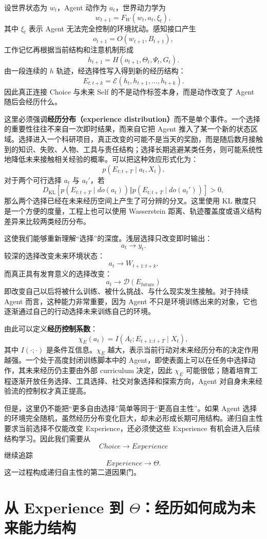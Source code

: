 设世界状态为 $w_t$，Agent 动作为 $a_t$，世界动力学为
\[
w_{t+1}=F_W(w_t,a_t,\xi_t),
\]
其中 $\xi_t$ 表示 Agent 无法完全控制的环境扰动。感知接口产生
\[
o_{t+1}=O(w_{t+1},B_{t+1}),
\]
工作记忆再根据当前结构和注意机制形成
\[
h_{t+1}=H(o_{t+1},\Theta_t,\Psi_t,G_t).
\]
由一段连续的 $h$ 轨迹，经选择性写入得到新的经历结构：
\[
E_{t:t+k}
=
\mathcal E
\left(
h_t,h_{t+1},\ldots,h_{t+k}
\right).
\]
因此真正连接 Choice 与未来 Self 的不是动作标签本身，而是动作改变了 Agent 随后会经历什么。

这里必须强调\textbf{经历分布（experience distribution）}而不是单个事件。一个选择的重要性往往不来自一次即时结果，而来自它把 Agent 推入了某一个新的状态区域。选择进入一个科研项目，真正改变的可能不是当天的奖励，而是随后数月接触到的知识、失败、人物、工具与责任结构；选择长期逃避某类任务，则可能系统性地降低未来接触相关经验的概率。可以把这种效应形式化为：
\[
p(E_{t:t+T}\mid a_t,X_t).
\]
对于两个可行选择 $a_t$ 与 $a_t'$，若
\[
D_{\mathrm{KL}}
\left[
p(E_{t:t+T}\mid do(a_t))
\Vert
p(E_{t:t+T}\mid do(a_t'))
\right]
>0,
\]
那么两个选择已经在未来经历空间上产生了可分辨的分叉。这里使用 KL 散度只是一个方便的度量，工程上也可以使用 Wasserstein 距离、轨迹覆盖度或语义结构差异来比较两类经历分布。

这使我们能够重新理解“选择”的深度。浅层选择只改变即时输出：
\[
a_t\rightarrow y_t.
\]
较深的选择改变未来环境状态：
\[
a_t\rightarrow W_{t+1:t+k}.
\]
而真正具有发育意义的选择改变：
\[
\boxed{
a_t\rightarrow
\mathcal D(E_{\mathrm{future}})
}
\]
即改变自己以后将被什么训练、被什么挑战、与什么现实发生接触。对于持续 Agent 而言，这种能力非常重要，因为 Agent 不只是环境训练出来的对象，它也逐渐通过自己的行动选择未来训练自己的环境。

由此可以定义\textbf{经历控制系数}：
\[
\chi_E(a_t)
=
I
\left(
A_t;
E_{t+1:t+T}
\mid X_t
\right),
\]
其中 $I(\cdot;\cdot)$ 是条件互信息。$\chi_E$ 越大，表示当前行动对未来经历分布的决定作用越强。一个处于高度封闭训练脚本中的 Agent，即使表面上可以在任务中选择动作，其未来经历仍主要由外部 curriculum 决定，因此 $\chi_E$ 可能很低；随着培育工程逐渐开放任务选择、工具选择、社交对象选择和探索方向，Agent 对自身未来经验流的控制权才真正提高。

但是，这里仍不能把“更多自由选择”简单等同于“更高自主性”。如果 Agent 选择的环境完全随机，虽然经历分布变化巨大，却未必形成长期可用结构。递归自主性要求当前选择不仅能改变 Experience，还必须使这些 Experience 有机会进入后续结构学习。因此我们需要从
\[
Choice\rightarrow Experience
\]
继续追踪
\[
Experience\rightarrow\Theta.
\]
这一过程构成递归自主性的第二道因果门。

\section{从 Experience 到 \texorpdfstring{$\Theta$}{Theta}：经历如何成为未来能力结构}

